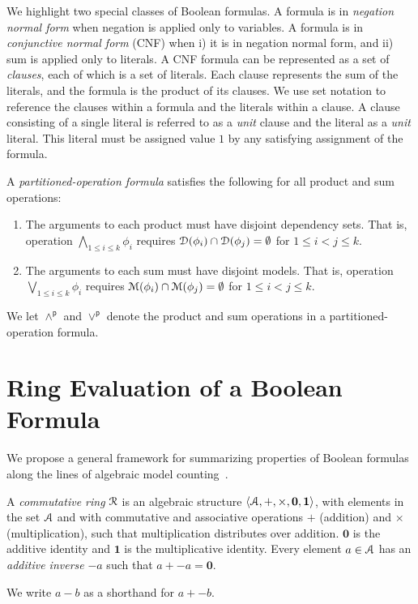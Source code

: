 \documentclass[letterpaper,USenglish,cleveref, autoref, thm-restate]{lipics-v2021}
\newcommand{\pand}{\mathbin{\land^\textsf{p}}}
\newcommand{\por}{\mathbin{\lor^\textsf{p}}}
\newcommand{\dependencyset}{{\cal D}}
\newcommand{\ring}{{\cal R}}
\newcommand{\dset}{{\cal A}}
\newcommand{\radd}{+}
\newcommand{\rmul}{\times}
\newcommand{\addident}{\textbf{0}}
\newcommand{\mulident}{\textbf{1}}
\newcommand{\modelset}{{\cal M}}
\begin{document}
  We highlight two special classes of Boolean formulas.  A formula is
  in \emph{negation normal form} when negation is applied only to variables.  A
  formula is in \emph{conjunctive normal form} (CNF) when i) it is in
  negation normal form, and ii) sum is applied only to literals.  A CNF
  formula can be represented as a set of \emph{clauses}, each of which is a
  set of literals.  Each clause represents the sum of the
  literals, and the formula is the product of its clauses.  We use
  set notation to reference the clauses within a formula and the
  literals within a clause.  A clause consisting of a single literal is referred to as a \emph{unit} clause and the literal as a \emph{unit} literal.
This literal must be assigned value $1$ by any satisfying assignment of the formula.

\begin{definition}\label{def:partitioned-operation-formula}
  A \emph{partitioned-operation formula}
 satisfies the following for all product and sum operations:
      \begin{enumerate}
      \item The arguments to each product must have disjoint dependency sets.  That is, operation
        $\bigwedge_{1 \leq i \leq k} \phi_i$ requires $\dependencyset(\phi_i) \cap \dependencyset(\phi_j) = \emptyset$ for $1 \leq i < j \leq k$.
      \item The arguments to each sum must have disjoint models.  That is, operation
        $\bigvee_{1 \leq i \leq k} \phi_i$ requires $\modelset(\phi_i) \cap \modelset(\phi_j) = \emptyset$ for $1 \leq i < j \leq k$.
      \end{enumerate}
\end{definition}
     We let $\pand$ and $\por$ denote the product and sum operations in a partitioned-operation formula.

  \section{Ring Evaluation of a Boolean Formula}

We propose a general framework for summarizing properties of Boolean
formulas along the lines of algebraic model counting~\cite{kimmig:jal:2017}.

\begin{definition}
  A \emph{commutative ring} $\ring$ is an algebraic structure
  $\langle \dset, \radd, \rmul, \addident, \mulident \rangle$,
  with elements in the set $\dset$ and with commutative and
  associative operations $\radd$ (addition) and $\rmul$ (multiplication),
  such that multiplication distributes
  over addition.  $\addident$ is the additive identity and $\mulident$ is
  the multiplicative identity.  Every element $a \in \dset$ has an
  \emph{additive inverse} $-a$ such that $a + -a = \addident$.
\label{def:ring}
\end{definition}
We write $a - b$ as a shorthand for $a + -b$.
\end{document}

